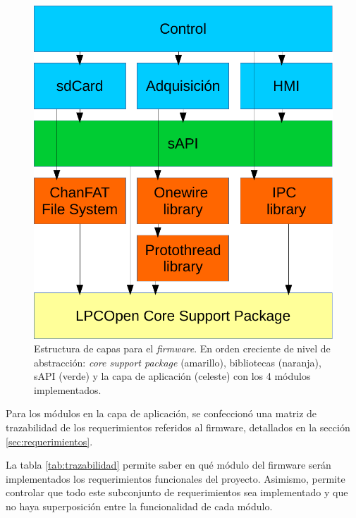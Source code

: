 \begin{figure}[ht]
	\centering
	\includegraphics[width=.5\textwidth]{./Figures/capas.pdf}
	\caption[Estructura de capas para el \textit{firmware}.]{Estructura de capas para el \textit{firmware}. En orden creciente de nivel de abstracción: \textit{core support package} (amarillo), bibliotecas (naranja), sAPI (verde) y la capa de aplicación (celeste) con los 4 módulos implementados.}
	\label{fig:capas}
\end{figure}

\vspace{10px}

Para los módulos en la capa de aplicación, se confeccionó una matriz de trazabilidad de los requerimientos referidos al firmware, detallados en la sección \ref{sec:requerimientos}. 

La tabla \ref{tab:trazabilidad} permite saber en qué módulo del firmware serán implementados los requerimientos funcionales del proyecto.  Asimismo, permite controlar que todo este subconjunto de requerimientos sea implementado y que no haya superposición entre la funcionalidad de cada módulo.

\vspace{10px}

